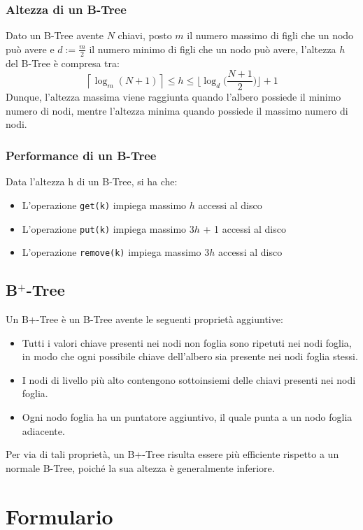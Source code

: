 \documentclass{article}
\begin{document}
\subsubsection{Altezza di un B-Tree}
Dato un B-Tree avente $N$ chiavi, posto $m$ il numero massimo di figli che un nodo può avere e $d := \frac{m}{2}$ il numero minimo di figli che un nodo può avere, l'altezza $h$ del B-Tree è compresa tra:
\[
\left\lceil \log_m(N+1) \right\rceil \leq h \leq \biggl\lfloor \log_d \biggl( \frac{N+1}{2} \biggr) \biggr\rfloor + 1
\]
Dunque, l'altezza massima viene raggiunta quando l'albero possiede il minimo numero di nodi, mentre l'altezza minima quando possiede il massimo numero di nodi.
\subsubsection{Performance di un B-Tree}
Data l'altezza h di un B-Tree, si ha che:
\begin{itemize}
  \item L'operazione \texttt{get(k)} impiega massimo $h$ accessi al disco
  \item L'operazione \texttt{put(k)} impiega massimo 3$h$ + 1 accessi al disco 
  \item L'operazione \texttt{remove(k)} impiega massimo 3$h$ accessi al disco
\end{itemize}

\subsection{B$^+$-Tree}
Un B+-Tree è un B-Tree avente le seguenti proprietà aggiuntive:
\begin{itemize}
    \item Tutti i valori chiave presenti nei nodi non foglia sono ripetuti nei nodi foglia, in modo che ogni possibile chiave dell'albero sia presente nei nodi foglia stessi.
    \item I nodi di livello più alto contengono sottoinsiemi delle chiavi presenti nei nodi foglia.
    \item Ogni nodo foglia ha un puntatore aggiuntivo, il quale punta a un nodo foglia adiacente.
\end{itemize}
Per via di tali proprietà, un B+-Tree risulta essere più efficiente rispetto a un normale B-Tree, poiché la sua altezza è generalmente inferiore.

\section{Formulario}
\end{document}
